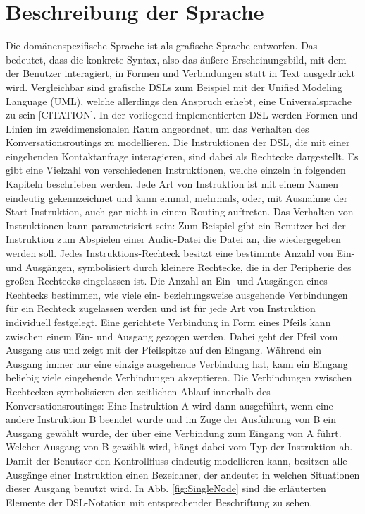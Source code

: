 \section{Beschreibung der Sprache}
Die domänenspezifische Sprache ist als grafische Sprache entworfen. Das bedeutet, dass die konkrete Syntax, also das äußere Erscheinungsbild, mit dem der Benutzer interagiert, in Formen und Verbindungen statt in Text ausgedrückt wird. Vergleichbar sind grafische DSLs zum Beispiel mit der Unified Modeling Language (UML), welche allerdings den Anspruch erhebt, eine Universalsprache zu sein [CITATION].
\newline 
In der vorliegend implementierten DSL werden Formen und Linien im zweidimensionalen Raum angeordnet, um das Verhalten des Konversationsroutings zu modellieren. Die Instruktionen der DSL, die mit einer eingehenden Kontaktanfrage interagieren, sind dabei als Rechtecke dargestellt. Es gibt eine Vielzahl von verschiedenen Instruktionen, welche einzeln in folgenden Kapiteln beschrieben werden. Jede Art von  Instruktion ist mit einem Namen eindeutig gekennzeichnet und kann einmal, mehrmals, oder, mit Ausnahme der Start-Instruktion, auch gar nicht in einem Routing auftreten. Das Verhalten von Instruktionen kann parametrisiert sein: Zum Beispiel gibt ein Benutzer bei der Instruktion zum Abspielen einer Audio-Datei die Datei an, die wiedergegeben werden soll. Jedes Instruktions-Rechteck besitzt eine bestimmte Anzahl von Ein- und Ausgängen, symbolisiert durch kleinere Rechtecke, die in der Peripherie des großen Rechtecks eingelassen ist. Die Anzahl an Ein- und Ausgängen eines Rechtecks bestimmen, wie viele ein- beziehungsweise ausgehende Verbindungen für ein Rechteck zugelassen werden und ist für jede Art von Instruktion individuell festgelegt. Eine gerichtete Verbindung in Form eines Pfeils kann zwischen einem Ein- und Ausgang gezogen werden. Dabei geht der Pfeil vom Ausgang aus und zeigt mit der Pfeilspitze auf den Eingang. Während ein Ausgang immer nur eine einzige ausgehende Verbindung hat, kann ein Eingang beliebig viele eingehende Verbindungen akzeptieren. Die Verbindungen zwischen Rechtecken symbolisieren den zeitlichen Ablauf innerhalb des Konversationsroutings: Eine Instruktion A wird dann ausgeführt, wenn eine andere Instruktion B beendet wurde und im Zuge der Ausführung von B ein Ausgang gewählt wurde, der über eine Verbindung zum Eingang von A führt. Welcher Ausgang von B gewählt wird, hängt dabei vom Typ der Instruktion ab. Damit der Benutzer den Kontrollfluss eindeutig modellieren kann, besitzen alle Ausgänge einer Instruktion einen Bezeichner, der andeutet in welchen Situationen dieser Ausgang benutzt wird.  In Abb. \ref{fig:SingleNode} sind die erläuterten Elemente der DSL-Notation mit entsprechender Beschriftung zu sehen.

